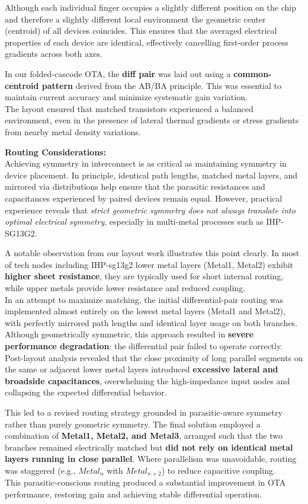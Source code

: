 \documentclass[
  11pt,
  a4paper,
  oneside]{scrbook}
\begin{document}
Although each individual finger occupies a slightly different position
on the chip and therefore a slightly different local environment the
geometric center (centroid) of all devices coincides. This ensures that
the averaged electrical properties of each device are identical,
effectively cancelling first-order process gradients across both axes.

In our folded-cascode OTA, the \textbf{diff pair} was laid out using a
\textbf{common-centroid pattern} derived from the AB/BA principle. This
was essential to maintain current accuracy and minimize systematic gain
variation.\\
The layout ensured that matched transistors experienced a balanced
environment, even in the presence of lateral thermal gradients or stress
gradients from nearby metal density variations.

\textbf{Routing Considerations:}\\
Achieving symmetry in interconnect is as critical as maintaining
symmetry in device placement. In principle, identical path lengths,
matched metal layers, and mirrored via distributions help ensure that
the parasitic resistances and capacitances experienced by paired devices
remain equal. However, practical experience reveals that \emph{strict
geometric symmetry does not always translate into optimal electrical
symmetry}, especially in multi-metal processes such as IHP-SG13G2.

A notable observation from our layout work illustrates this point
clearly. In most of tech nodes including IHP-sg13g2 lower metal layers
(Metal1, Metal2) exhibit \textbf{higher sheet resistance}, they are
typically used for short internal routing, while upper metals provide
lower resistance and reduced coupling.\\
In an attempt to maximize matching, the initial differential-pair
routing was implemented almost entirely on the lowest metal layers
(Metal1 and Metal2), with perfectly mirrored path lengths and identical
layer usage on both branches. Although geometrically symmetric, this
approach resulted in \textbf{severe performance degradation}: the
differential pair failed to operate correctly.\\
Post-layout analysis revealed that the close proximity of long parallel
segments on the same or adjacent lower metal layers introduced
\textbf{excessive lateral and broadside capacitances}, overwhelming the
high-impedance input nodes and collapsing the expected differential
behavior.

This led to a revised routing strategy grounded in parasitic-aware
symmetry rather than purely geometric symmetry. The final solution
employed a combination of \textbf{Metal1, Metal2, and Metal3}, arranged
such that the two branches remained electrically matched but \textbf{did
not rely on identical metal layers running in close parallel}. Where
parallelism was unavoidable, routing was staggered (e.g., \(Metal_n\)
with \(Metal_{n+2}\)) to reduce capacitive coupling.\\
This parasitic-conscious routing produced a substantial improvement in
OTA performance, restoring gain and achieving stable differential
operation.
\end{document}
